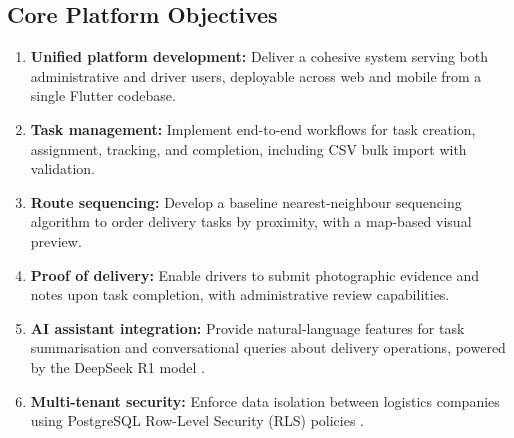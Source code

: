 \subsection{Core Platform Objectives}
\begin{enumerate}
  \item \textbf{Unified platform development:} Deliver a cohesive system serving both administrative and driver users, deployable across web and mobile from a single Flutter codebase.
  \item \textbf{Task management:} Implement end-to-end workflows for task creation, assignment, tracking, and completion, including CSV bulk import with validation.
  \item \textbf{Route sequencing:} Develop a baseline nearest-neighbour sequencing algorithm to order delivery tasks by proximity, with a map-based visual preview.
  \item \textbf{Proof of delivery:} Enable drivers to submit photographic evidence and notes upon task completion, with administrative review capabilities.
  \item \textbf{AI assistant integration:} Provide natural-language features for task summarisation and conversational queries about delivery operations, powered by the DeepSeek R1 model \autocite{deepseek2025r1}.
  \item \textbf{Multi-tenant security:} Enforce data isolation between logistics companies using PostgreSQL Row-Level Security (RLS) policies \autocite{postgresql2026rls}.
\end{enumerate}

